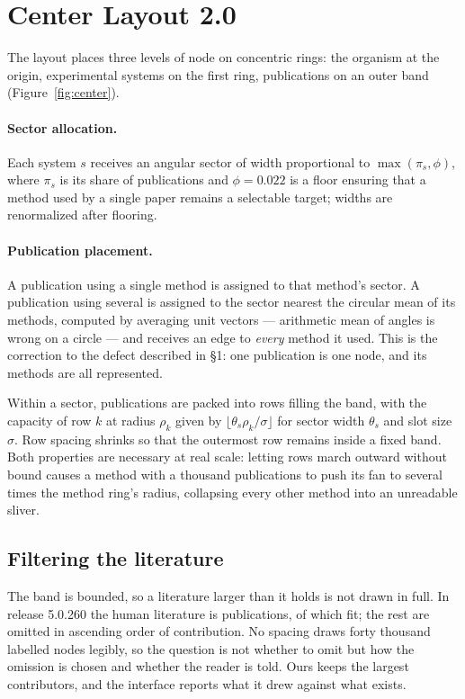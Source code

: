 \documentclass[conference]{IEEEtran}
\begin{document}
\section{Center Layout 2.0}
\label{sec:layout}

The layout places three levels of node on concentric rings: the organism at the origin,
experimental systems on the first ring, publications on an outer band
(Figure~\ref{fig:center}).

\paragraph{Sector allocation.} Each system $s$ receives an angular sector of width
proportional to $\max(\pi_s, \phi)$, where $\pi_s$ is its share of publications and
$\phi = 0.022$ is a floor ensuring that a method used by a single paper remains a
selectable target; widths are renormalized after flooring.

\paragraph{Publication placement.} A publication using a single method is assigned to
that method's sector. A publication using several is assigned to the sector nearest the
circular mean of its methods, computed by averaging unit vectors --- arithmetic mean of
angles is wrong on a circle --- and receives an edge to \emph{every} method it used.
This is the correction to the defect described in \S1: one publication is one node, and
its methods are all represented.

Within a sector, publications are packed into rows filling the band, with the capacity
of row $k$ at radius $\rho_k$ given by $\lfloor \theta_s \rho_k / \sigma \rfloor$ for
sector width $\theta_s$ and slot size $\sigma$. Row spacing shrinks so that the
outermost row remains inside a fixed band. Both properties are necessary at real scale:
letting rows march outward without bound causes a method with a thousand publications
to push its fan to several times the method ring's radius, collapsing every other method
into an unreadable sliver.

\subsection{Filtering the literature}
\label{sec:filter}

The band is bounded, so a literature larger than it holds is not drawn in full. In
release 5.0.260 the human literature is \HumanPublications{} publications, of which
\HumanPublicationsDrawn{} fit; the rest are omitted in ascending order of contribution.
No spacing draws forty thousand labelled nodes legibly, so the question is not whether
to omit but how the omission is chosen and whether the reader is told. Ours keeps the
largest contributors, and the interface reports what it drew against what exists.
\end{document}
